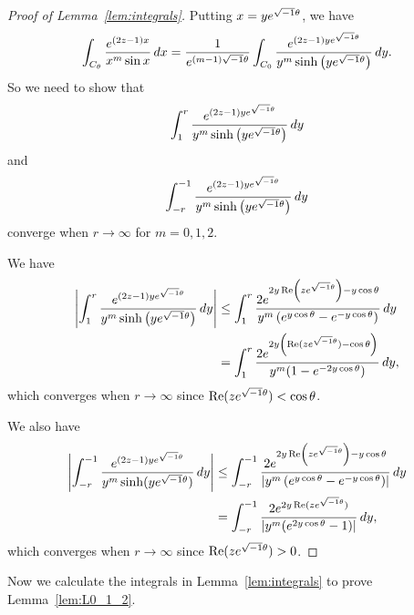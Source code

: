 \begin{proof}[Proof of Lemma~\ref{lem:integrals}]
Putting $x=ye^{\sqrt{-1}\theta}$, we have
\begin{equation*}
  \int_{C_{\theta}}
  \frac{e^{(2z-1)x}}{x^m\sin{x}}\,dx
  =
  \frac{1}{e^{(m-1)\sqrt{-1}\theta}}
  \int_{C_{0}}
  \frac{e^{(2z-1)ye^{\sqrt{-1}\theta}}}{y^{m}\sinh\left(ye^{\sqrt{-1}\theta}\right)}\,dy.
\end{equation*}
So we need to show that
\begin{equation*}
  \int_{1}^{r}
  \frac{e^{(2z-1)ye^{\sqrt{-1}\theta}}}{y^{m}\sinh\left(ye^{\sqrt{-1}\theta}\right)}\,dy
\end{equation*}
and
\begin{equation*}
  \int_{-r}^{-1}
  \frac{e^{(2z-1)ye^{\sqrt{-1}\theta}}}{y^{m}\sinh\left(ye^{\sqrt{-1}\theta}\right)}\,dy
\end{equation*}
converge when $r\to\infty$ for $m=0,1,2$.
\par
We have
\begin{equation*}
\begin{split}
  \left|
    \int_{1}^{r}
    \frac{e^{(2z-1)ye^{\sqrt{-1}\theta}}}{y^{m}\sinh\left(ye^{\sqrt{-1}\theta}\right)}\,dy
  \right|
  &\le
  \int_{1}^{r}
  \frac{2e^{2y\operatorname{Re}\left(ze^{\sqrt{-1}\theta}\right)-y\cos\theta}}
       {y^{m}\left(e^{y\cos\theta}-e^{-y\cos\theta}\right)}\,dy
  \\
  &=
  \int_{1}^{r}
  \frac{2e^{2y\left(\operatorname{Re}(ze^{\sqrt{-1}\theta})-\cos\theta\right)}}
       {y^{m}(1-e^{-2y\cos\theta})}\,dy,
\end{split}
\end{equation*}
which converges when $r\to\infty$ since $\operatorname{Re}(ze^{\sqrt{-1}\theta})<\cos\theta$.
\par
We also have
\begin{equation*}
\begin{split}
  \left|
    \int_{-r}^{-1}
    \frac{e^{(2z-1)ye^{\sqrt{-1}\theta}}}{y^{m}\sinh(ye^{\sqrt{-1}\theta})}\,dy
  \right|
  &\le
  \int_{-r}^{-1}
  \frac{2e^{2y\operatorname{Re}\left(ze^{\sqrt{-1}\theta}\right)-y\cos\theta}}
       {\left|y^{m}\left(e^{y\cos\theta}-e^{-y\cos\theta}\right)\right|}\,dy
  \\
  &=
  \int_{-r}^{-1}
  \frac{2e^{2y\operatorname{Re}(ze^{\sqrt{-1}\theta})}}{\left|y^{m}(e^{2y\cos\theta}-1)\right|}\,dy,
\end{split}
\end{equation*}
which converges when $r\to\infty$ since $\operatorname{Re}(ze^{\sqrt{-1}\theta})>0$.
\end{proof}
Now we calculate the integrals in Lemma~\ref{lem:integrals} to prove Lemma~\ref{lem:L0_1_2}.
